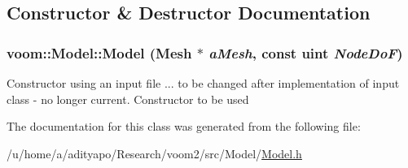 \subsection{Constructor \& Destructor Documentation}
\hypertarget{classvoom_1_1_model_aa9d7f41277483cb4141fcbb7556871a6}{
\subsubsection[{Model}]{\setlength{\rightskip}{0pt plus 5cm}voom::Model::Model ({\bf Mesh} $\ast$ {\em aMesh}, \/  const uint {\em NodeDoF})}}
\label{classvoom_1_1_model_aa9d7f41277483cb4141fcbb7556871a6}


Constructor using an input file ... to be changed after implementation of input class -\/ no longer current. Constructor to be used 

The documentation for this class was generated from the following file:\begin{DoxyCompactItemize}
\item 
/u/home/a/adityapo/Research/voom2/src/Model/\hyperlink{_model_8h}{Model.h}\end{DoxyCompactItemize}
